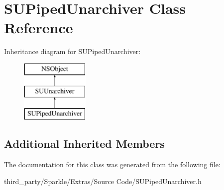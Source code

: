 \hypertarget{interface_s_u_piped_unarchiver}{}\section{S\+U\+Piped\+Unarchiver Class Reference}
\label{interface_s_u_piped_unarchiver}
Inheritance diagram for S\+U\+Piped\+Unarchiver\+:\begin{figure}[H]
\begin{center}
\leavevmode
\includegraphics[height=3.000000cm]{interface_s_u_piped_unarchiver}
\end{center}
\end{figure}
\subsection*{Additional Inherited Members}


The documentation for this class was generated from the following file\+:\begin{DoxyCompactItemize}
\item 
third\+\_\+party/\+Sparkle/\+Extras/\+Source Code/S\+U\+Piped\+Unarchiver.\+h\end{DoxyCompactItemize}
